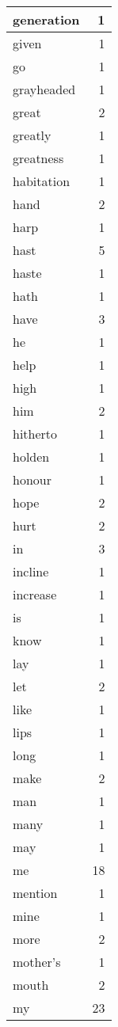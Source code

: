 \begin{center}
\begin{longtable}{l|r}
generation & 1 \\ \hline
given & 1 \\ \hline
go & 1 \\ \hline
grayheaded & 1 \\ \hline
great & 2 \\ \hline
greatly & 1 \\ \hline
greatness & 1 \\ \hline
habitation & 1 \\ \hline
hand & 2 \\ \hline
harp & 1 \\ \hline
hast & 5 \\ \hline
haste & 1 \\ \hline
hath & 1 \\ \hline
have & 3 \\ \hline
he & 1 \\ \hline
help & 1 \\ \hline
high & 1 \\ \hline
him & 2 \\ \hline
hitherto & 1 \\ \hline
holden & 1 \\ \hline
honour & 1 \\ \hline
hope & 2 \\ \hline
hurt & 2 \\ \hline
in & 3 \\ \hline
incline & 1 \\ \hline
increase & 1 \\ \hline
is & 1 \\ \hline
know & 1 \\ \hline
lay & 1 \\ \hline
let & 2 \\ \hline
like & 1 \\ \hline
lips & 1 \\ \hline
long & 1 \\ \hline
make & 2 \\ \hline
man & 1 \\ \hline
many & 1 \\ \hline
may & 1 \\ \hline
me & 18 \\ \hline
mention & 1 \\ \hline
mine & 1 \\ \hline
more & 2 \\ \hline
mother's & 1 \\ \hline
mouth & 2 \\ \hline
my & 23 \\ \hline

\end{longtable}
\end{center}
